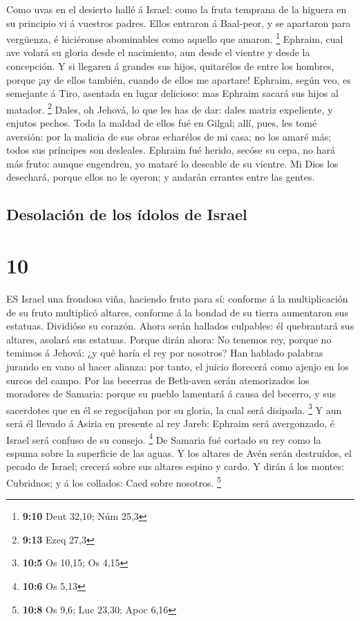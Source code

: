  Como uvas en el desierto hallé á Israel: como la fruta
temprana de la higuera en su principio vi á vuestros padres. Ellos
entraron á Baal-peor, y se apartaron para vergüenza, é hiciéronse
abominables como aquello que amaron. \footnote{\textbf{9:10} Deut 32,10;
  Núm 25,3}  Ephraim, cual ave volará su gloria desde el
nacimiento, aun desde el vientre y desde la concepción.  Y
si llegaren á grandes sus hijos, quitarélos de entre los hombres, porque
¡ay de ellos también, cuando de ellos me apartare! 
Ephraim, según veo, es semejante á Tiro, asentada en lugar delicioso:
mas Ephraim sacará sus hijos al matador. \footnote{\textbf{9:13} Ezeq
  27,3}  Dales, oh Jehová, lo que les has de dar: dales
matriz expeliente, y enjutos pechos.  Toda la maldad de
ellos fué en Gilgal; allí, pues, les tomé aversión: por la malicia de
sus obras echarélos de mi casa; no los amaré más; todos sus príncipes
son desleales.  Ephraim fué herido, secóse su cepa, no hará
más fruto: aunque engendren, yo mataré lo deseable de su vientre.
 Mi Dios los desechará, porque ellos no le oyeron; y
andarán errantes entre las gentes.

\hypertarget{desolaciuxf3n-de-los-uxeddolos-de-israel}{%
\subsection{Desolación de los ídolos de
Israel}\label{desolaciuxf3n-de-los-uxeddolos-de-israel}}

\hypertarget{section-9}{%
\section{10}\label{section-9}}

 ES Israel una frondosa viña, haciendo fruto para sí:
conforme á la multiplicación de su fruto multiplicó altares, conforme á
la bondad de su tierra aumentaron sus estatuas.  Dividióse
su corazón. Ahora serán hallados culpables: él quebrantará sus altares,
asolará sus estatuas.  Porque dirán ahora: No tenemos rey,
porque no temimos á Jehová: ¿y qué haría el rey por nosotros?
 Han hablado palabras jurando en vano al hacer alianza: por
tanto, el juicio florecerá como ajenjo en los surcos del campo.
 Por las becerras de Beth-aven serán atemorizados los
moradores de Samaria: porque su pueblo lamentará á causa del becerro, y
sus sacerdotes que en él se regocijaban por su gloria, la cual será
disipada. \footnote{\textbf{10:5} Os 10,15; Os 4,15}  Y aun
será él llevado á Asiria en presente al rey Jareb: Ephraim será
avergonzado, é Israel será confuso de su consejo. \footnote{\textbf{10:6}
  Os 5,13}  De Samaria fué cortado su rey como la espuma
sobre la superficie de las aguas.  Y los altares de Avén
serán destruídos, el pecado de Israel; crecerá sobre sus altares espino
y cardo. Y dirán á los montes: Cubridnos; y á los collados: Caed sobre
nosotros. \footnote{\textbf{10:8} Os 9,6; Luc 23,30; Apoc 6,16}

